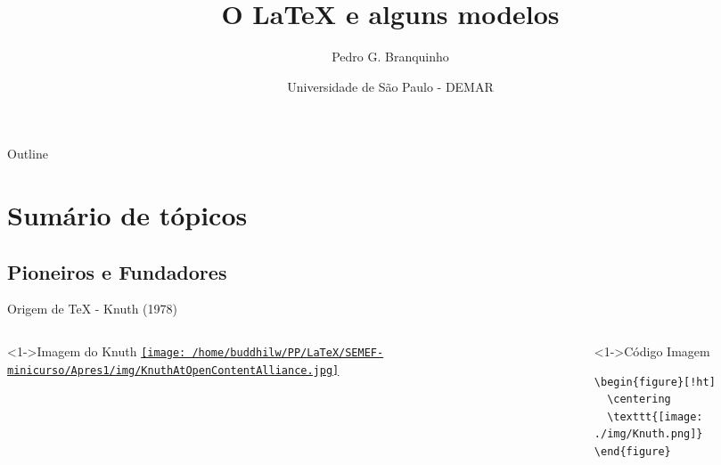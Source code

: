 \documentclass[bigger]{beamer}
\author{Pedro G. Branquinho}
\date{  Universidade de São Paulo - DEMAR}
\title{O \LaTeX{} e alguns modelos}
\begin{document}
\maketitle
\begin{frame}{Outline}
\tableofcontents
\end{frame}


\section{Sumário de tópicos}
\label{sec:orgfc92593}
\subsection{Pioneiros e Fundadores}
\label{sec:orgd3cd4f3}
\begin{frame}[label={sec:org798d10f},fragile]{Origem de \TeX{} - Knuth (1978)}
 \begin{columns}
\begin{column}{0.48\columnwidth}
\begin{block}<1->{Imagem do Knuth}
\href{img/KnuthAtOpenContentAlliance.jpg}{\texttt{[image: /home/buddhilw/PP/LaTeX/SEMEF-minicurso/Apres1/img/KnuthAtOpenContentAlliance.jpg]}}
\end{block}
\end{column}
\begin{column}{0.48\columnwidth}
\begin{block}<1->{Código Imagem}
\begin{verbatim}
\begin{figure}[!ht]
  \centering
  \texttt{[image: ./img/Knuth.png]}
\end{figure}
\end{verbatim}
\end{block}
\end{column}
\end{columns}
\end{frame}
\end{document}
